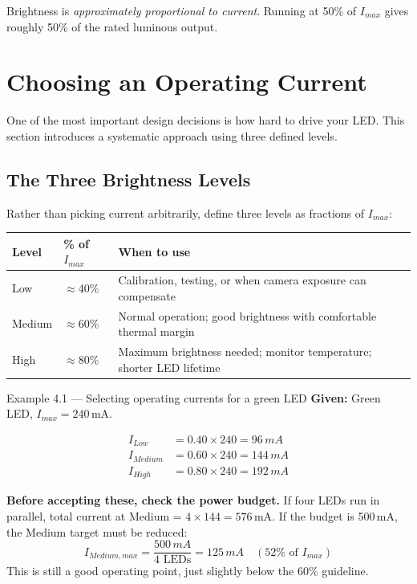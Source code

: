 \documentclass[11pt,letterpaper]{article}
\newcommand{\mA}{\,\si{mA}}
\newcommand{\Imax}{I_{max}}
\begin{document}
Brightness is \emph{approximately proportional to current}. Running at 50\% of $\Imax$
gives roughly 50\% of the rated luminous output.

\section{Choosing an Operating Current}

One of the most important design decisions is how hard to drive your LED. This section
introduces a systematic approach using three defined levels.

\subsection{The Three Brightness Levels}

Rather than picking current arbitrarily, define three levels as fractions of $\Imax$:

\begin{center}
\renewcommand{\arraystretch}{1.3}
\begin{tabular}{C{2cm} C{2.5cm} C{8cm}}
\toprule
\textbf{Level} & \textbf{\% of $\Imax$} & \textbf{When to use} \\
\midrule
Low    & $\approx$40\% & Calibration, testing, or when camera exposure can compensate \\
Medium & $\approx$60\% & Normal operation; good brightness with comfortable thermal margin \\
High   & $\approx$80\% & Maximum brightness needed; monitor temperature; shorter LED lifetime \\
\bottomrule
\end{tabular}
\end{center}

\begin{examplebox}{Example 4.1 --- Selecting operating currents for a green LED}
\textbf{Given:} Green LED, $\Imax = 240$\mA.

\begin{align*}
I_{Low}    &= 0.40 \times 240 = 96\mA \\
I_{Medium} &= 0.60 \times 240 = 144\mA \\
I_{High}   &= 0.80 \times 240 = 192\mA
\end{align*}

\textbf{Before accepting these, check the power budget.} If four LEDs run in parallel,
total current at Medium = $4 \times 144 = 576$\mA. If the budget is 500\mA, the
Medium target must be reduced:
\[ I_{Medium,max} = \frac{500\mA}{4\text{ LEDs}} = 125\mA \quad (52\%\text{ of }\Imax) \]
This is still a good operating point, just slightly below the 60\% guideline.
\end{examplebox}
\end{document}
